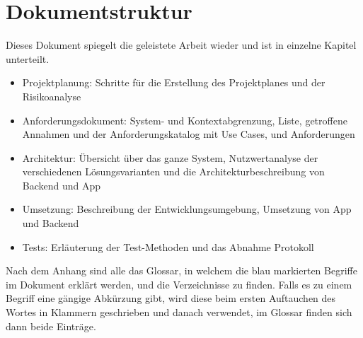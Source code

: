 \section{Dokumentstruktur}\label{nicht_ziele}
Dieses Dokument spiegelt die geleistete Arbeit wieder und ist in einzelne Kapitel unterteilt.
\begin{itemize}
\item Projektplanung: Schritte für die Erstellung des Projektplanes und der Risikoanalyse
\item Anforderungsdokument: System- und Kontextabgrenzung,  Liste, getroffene Annahmen und der Anforderungskatalog mit Use Cases,  und Anforderungen
\item Architektur: Übersicht über das ganze System, Nutzwertanalyse der verschiedenen Lösungsvarianten und die Architekturbeschreibung von Backend und App
\item Umsetzung: Beschreibung der Entwicklungsumgebung, Umsetzung von App und Backend
\item Tests: Erläuterung der Test-Methoden und das Abnahme Protokoll
\end{itemize}

Nach dem Anhang sind alle das Glossar, in welchem die blau markierten Begriffe im Dokument erklärt werden, und die Verzeichnisse zu finden. Falls es zu einem Begriff eine gängige Abkürzung gibt, wird diese beim ersten Auftauchen des Wortes in Klammern geschrieben und danach verwendet, im Glossar finden sich dann beide Einträge.
